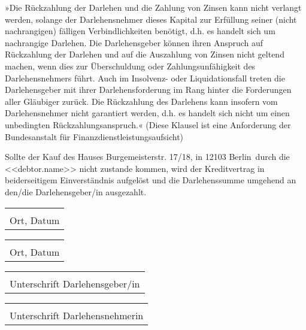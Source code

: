 \documentclass[]{scrartcl}
\newcommand{\addressStreet}{Burgemeisterstr. 17/18}
\newcommand{\addressWithZIP}{\addressStreet, in 12103 Berlin}
\begin{document}
\begin{contract}
»Die Rückzahlung der Darlehen und die Zahlung von Zinsen kann nicht verlangt werden, solange der Darlehensnehmer dieses Kapital zur Erfüllung seiner (nicht nachrangigen) fälligen Verbindlichkeiten benötigt, d.h. es handelt sich um nachrangige Darlehen. Die Darlehensgeber können ihren Anspruch auf Rückzahlung der Darlehen und auf die Auszahlung von Zinsen nicht geltend machen, wenn dies zur Überschuldung oder Zahlungsunfähigkeit des Darlehensnehmers führt. Auch im Insolvenz- oder Liquidationsfall treten die Darlehensgeber mit ihrer Darlehensforderung im Rang hinter die Forderungen aller Gläubiger zurück. Die Rückzahlung des Darlehens kann insofern vom Darlehensnehmer nicht garantiert werden, d.h. es handelt sich nicht um einen unbedingten Rückzahlungsanspruch.« (Diese Klausel ist eine Anforderung der Bundesanstalt für Finanzdienstleistungsaufsicht)

Sollte der Kauf des Hauses \addressWithZIP\ durch die <<debtor.name>> nicht zustande kommen, wird der Kreditvertrag in beiderseitigem Einverständnis aufgelöst und die Darlehenssumme umgehend an den/die Darlehensgeber/in ausgezahlt.

\end{contract}

\vspace{1,5 cm}
\begin{tabular}{p{6cm}}
\dotfill \\
Ort, Datum
\end{tabular}%
\hfill
\begin{tabular}{p{6cm}}
\dotfill \\
Ort, Datum
\end{tabular}%

\vspace{1,5 cm}
\begin{tabular}{p{6cm}}
\dotfill \\
Unterschrift Darlehensgeber/in
\end{tabular}%
\hfill
\begin{tabular}{p{6cm}}
\dotfill \\
Unterschrift Darlehensnehmerin
\end{tabular}%
\end{document}
